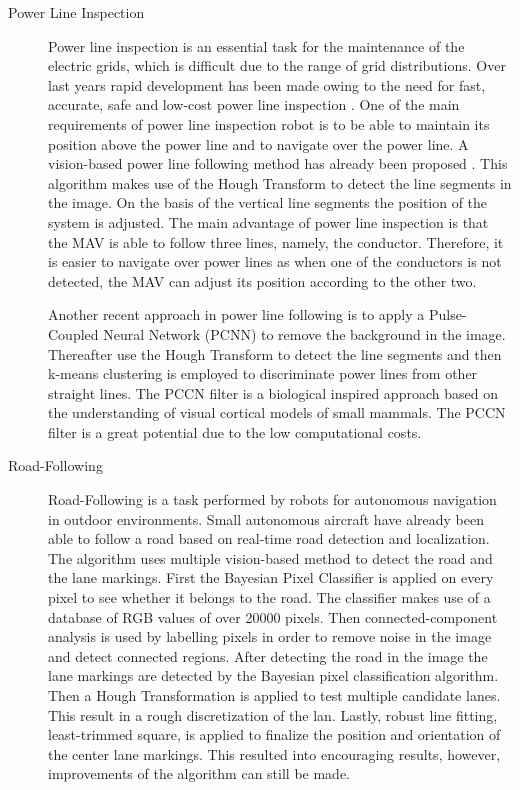 \documentclass[a4paper]{article}
\begin{document}
\begin{description}
\item[Power Line Inspection] Power line inspection is an essential task for the maintenance of the electric grids, which is difficult due to the range of grid distributions. Over last years rapid development has been made owing to the need for fast, accurate, safe and low-cost power line inspection \cite{Katrasnik2010}. One of the main requirements of power line inspection robot is to be able to maintain its position above the power line and to navigate over the power line. A vision-based power line following method has already been proposed \cite{Golightly2005}. This algorithm makes use of the Hough Transform to detect the line segments in the image. On the basis of the vertical line segments the position of the system is adjusted. The main advantage of power line inspection is that the MAV is able to follow three lines, namely, the conductor. Therefore, it is easier to navigate over power lines as when one of the conductors is not detected, the MAV can adjust its position according to the other two.

Another recent approach \cite{Zhengrong2008} in power line following is to apply a Pulse-Coupled Neural Network (PCNN) to remove the background in the image. Thereafter use the Hough Transform to detect the line segments and then k-means clustering is employed to discriminate power lines from other straight lines. The PCCN filter is a biological inspired approach based on the understanding of visual cortical models of small mammals. The PCCN filter is a great potential due to the low computational costs.

\item[Road-Following] Road-Following is a task performed by robots for autonomous navigation in outdoor environments. Small autonomous aircraft \cite{Frew2004} have already been able to follow a road based on real-time road detection and localization. The algorithm uses multiple vision-based method to detect the road and the lane markings. First the Bayesian Pixel Classifier is applied on every pixel to see whether it belongs to the road. The classifier makes use of a database of RGB values of over 20000 pixels. Then connected-component analysis is used by labelling pixels in order to remove noise in the image and detect connected regions. After detecting the road in the image the lane markings are detected by the Bayesian pixel classification algorithm. Then a Hough Transformation is applied to test multiple candidate lanes. This result in a rough discretization of the lan. Lastly, robust line fitting, least-trimmed square, is applied to finalize the position and orientation of the center lane markings. This resulted into encouraging results, however, improvements of the algorithm can still be made.


\end{description}
\end{document}
